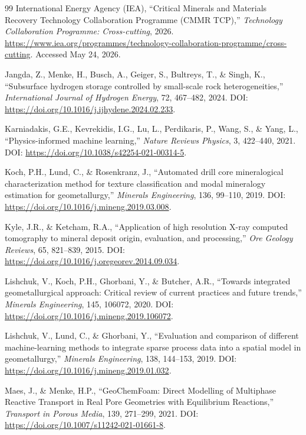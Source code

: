 \documentclass[12pt,a4paper]{article}
\begin{document}
\begin{thebibliography}{99}
International Energy Agency (IEA), ``Critical Minerals and Materials Recovery Technology Collaboration Programme (CMMR TCP),'' \textit{Technology Collaboration Programme: Cross-cutting}, 2026. \url{https://www.iea.org/programmes/technology-collaboration-programme/cross-cutting}. Accessed May 24, 2026.

Jangda, Z., Menke, H., Busch, A., Geiger, S., Bultreys, T., \& Singh, K., ``Subsurface hydrogen storage controlled by small-scale rock heterogeneities,'' \textit{International Journal of Hydrogen Energy}, 72, 467--482, 2024. DOI: \url{https://doi.org/10.1016/j.ijhydene.2024.02.233}.

Karniadakis, G.E., Kevrekidis, I.G., Lu, L., Perdikaris, P., Wang, S., \& Yang, L., ``Physics-informed machine learning,'' \textit{Nature Reviews Physics}, 3, 422--440, 2021. DOI: \url{https://doi.org/10.1038/s42254-021-00314-5}.

Koch, P.H., Lund, C., \& Rosenkranz, J., ``Automated drill core mineralogical characterization method for texture classification and modal mineralogy estimation for geometallurgy,'' \textit{Minerals Engineering}, 136, 99--110, 2019. DOI: \url{https://doi.org/10.1016/j.mineng.2019.03.008}.

Kyle, J.R., \& Ketcham, R.A., ``Application of high resolution X-ray computed tomography to mineral deposit origin, evaluation, and processing,'' \textit{Ore Geology Reviews}, 65, 821--839, 2015. DOI: \url{https://doi.org/10.1016/j.oregeorev.2014.09.034}.

Lishchuk, V., Koch, P.H., Ghorbani, Y., \& Butcher, A.R., ``Towards integrated geometallurgical approach: Critical review of current practices and future trends,'' \textit{Minerals Engineering}, 145, 106072, 2020. DOI: \url{https://doi.org/10.1016/j.mineng.2019.106072}.

Lishchuk, V., Lund, C., \& Ghorbani, Y., ``Evaluation and comparison of different machine-learning methods to integrate sparse process data into a spatial model in geometallurgy,'' \textit{Minerals Engineering}, 138, 144--153, 2019. DOI: \url{https://doi.org/10.1016/j.mineng.2019.01.032}.

Maes, J., \& Menke, H.P., ``GeoChemFoam: Direct Modelling of Multiphase Reactive Transport in Real Pore Geometries with Equilibrium Reactions,'' \textit{Transport in Porous Media}, 139, 271--299, 2021. DOI: \url{https://doi.org/10.1007/s11242-021-01661-8}.


\end{thebibliography}
\end{document}
